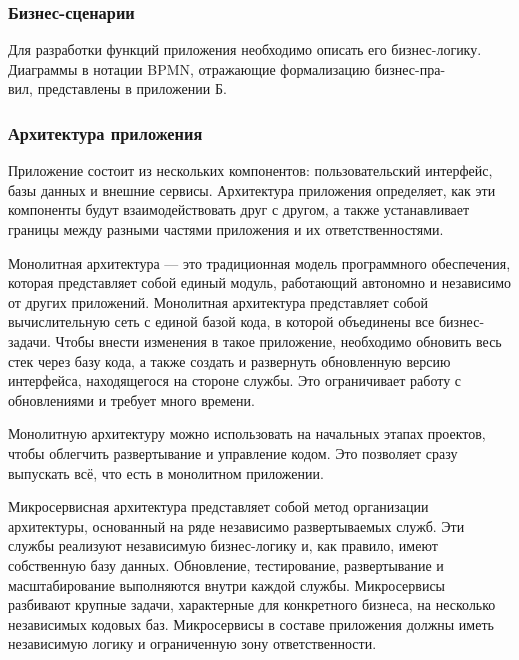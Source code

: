 \subsubsection{Бизнес-сценарии}

Для разработки функций приложения необходимо описать его бизнес-логику.
Диаграммы в нотации BPMN, отражающие формализацию бизнес-пра-\\вил, представлены в приложении Б.



\subsubsection{Архитектура приложения}

Приложение состоит из нескольких компонентов: пользовательский интерфейс, базы данных и внешние сервисы. Архитектура приложения определяет, как эти компоненты будут взаимодействовать друг с другом, а также устанавливает границы между разными частями приложения и их ответственностями.


Монолитная архитектура \cite{microservices} --- это традиционная модель программного обеспечения, которая представляет собой единый модуль, работающий автономно и независимо от других приложений. 
Монолитная архитектура представляет собой вычислительную сеть с единой базой кода, в которой объединены все бизнес-задачи. Чтобы внести изменения в такое приложение, необходимо обновить весь стек через базу кода, а также создать и развернуть обновленную версию интерфейса, находящегося на стороне службы. Это ограничивает работу с обновлениями и требует много времени.

Монолитную архитектуру можно использовать на начальных этапах проектов, чтобы облегчить развертывание и управление кодом. Это позволяет сразу выпускать всё, что есть в монолитном приложении.


Микросервисная архитектура \cite{microservices} представляет собой метод организации архитектуры, основанный на ряде независимо развертываемых служб. Эти службы реализуют независимую бизнес-логику и, как правило, имеют собственную базу данных. Обновление, тестирование, развертывание и масштабирование выполняются внутри каждой службы. Микросервисы разбивают крупные задачи, характерные для конкретного бизнеса, на несколько независимых кодовых баз. Микросервисы в составе приложения должны иметь независимую логику и ограниченную зону ответственности.

